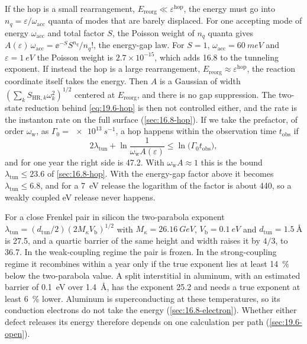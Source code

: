 If the hop is a small rearrangement, $E_{\mathrm{reorg}} \ll \varepsilon^{\mathrm{hop}}$, the energy must go into $n_q = \varepsilon/\omega_{\mathrm{acc}}$ quanta of modes that are barely displaced. For one accepting mode of energy $\omega_{\mathrm{acc}}$ and total factor $S$, the Poisson weight of $n_q$ quanta gives $A(\varepsilon)\,\omega_{\mathrm{acc}} = \ee^{-S}S^{n_q}/n_q!$, the energy-gap law. For $S = 1$, $\omega_{\mathrm{acc}} = \SI{60}{meV}$ and $\varepsilon = \SI{1}{eV}$ the Poisson weight is $2.7\times10^{-15}$, which adds 16.8 to the tunneling exponent. If instead the hop is a large rearrangement, $E_{\mathrm{reorg}} \approx \varepsilon^{\mathrm{hop}}$, the reaction coordinate itself takes the energy. Then $A$ is a Gaussian of width $(\sum_kS_{\mathrm{HR},k}\omega_k^2)^{1/2}$ centered at $E_{\mathrm{reorg}}$, and there is no gap suppression. The two-state reduction behind \cref{eq:19.6-hop} is then not controlled either, and the rate is the instanton rate on the full surface (\cref{sec:16.8-hop}). If we take the prefactor, of order $\omega_{\mathrm{w}}$, as $\varGamma_0 = \SI{e13}{s^{-1}}$, a hop happens within the observation time $t_{\mathrm{obs}}$ if
\begin{equation}
  2\lambda_{\mathrm{tun}} + \ln\frac{1}{\omega_{\mathrm{w}}A(\varepsilon)} \le \ln\bigl(\varGamma_0t_{\mathrm{obs}}\bigr) ,
  \label{eq:19.6-window}
\end{equation}
and for one year the right side is 47.2. With $\omega_{\mathrm{w}}A \approx 1$ this is the bound $\lambda_{\mathrm{tun}} \le 23.6$ of \cref{sec:16.8-hop}. With the energy-gap factor above it becomes $\lambda_{\mathrm{tun}} \le 6.8$, and for a \SI{7}{eV} release the logarithm of the factor is about 440, so a weakly coupled eV release never happens.

For a close Frenkel pair in silicon the two-parabola exponent $\lambda_{\mathrm{tun}} = (d_{\mathrm{tun}}/2)(2M_\kappa V_{\mathrm{b}})^{1/2}$ with $M_\kappa = \SI{26.16}{GeV}$, $V_{\mathrm{b}} = \SI{0.1}{eV}$ and $d_{\mathrm{tun}} = \SI{1.5}{\angstrom}$ is 27.5, and a quartic barrier of the same height and width raises it by $4/3$, to 36.7. In the weak-coupling regime the pair is frozen. In the strong-coupling regime it recombines within a year only if the true exponent lies at least \SI{14}{\percent} below the two-parabola value. A split interstitial in aluminum, with an estimated barrier of \SI{0.1}{eV} over \SI{1.4}{\angstrom}, has the exponent 25.2 and needs a true exponent at least \SI{6}{\percent} lower. Aluminum is superconducting at these temperatures, so its conduction electrons do not take the energy (\cref{sec:16.8-electron}). Whether either defect releases its energy therefore depends on one calculation per path (\cref{sec:19.6-open}).

